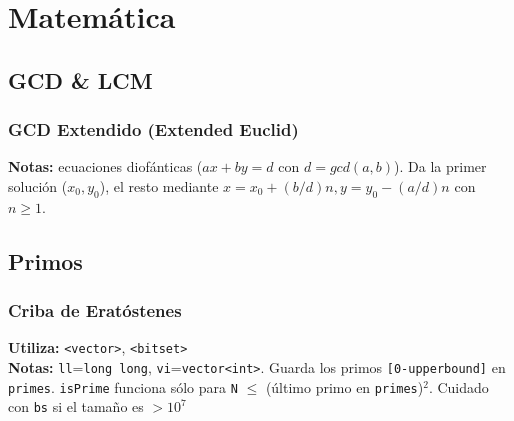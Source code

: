 \section{Matem\'atica}
\subsection{GCD \& LCM}

\subsubsection{GCD Extendido (Extended Euclid)}
\begin{footnotesize}
	\textbf{Notas:} ecuaciones diof\'anticas ($ax+by=d$ con $d=gcd(a,b)$). Da la primer soluci\'on ($x_{0},y_{0}$), el resto mediante $x=x_{0}+(b/d)n, y=y_{0}-(a/d)n$ con $n \geq 1$.
\end{footnotesize}

\subsection{Primos}
\subsubsection{Criba de Erat\'ostenes}
\begin{footnotesize}
	\textbf{Utiliza:} \texttt{<vector>}, \texttt{<bitset>}\\
	\textbf{Notas:} \texttt{ll}=\texttt{long long}, \texttt{vi}=\texttt{vector<int>}. Guarda los primos \texttt{[0-upperbound]} en \texttt{primes}. \texttt{isPrime} funciona s\'olo para \texttt{N} $\leq$ (\'ultimo primo en \texttt{primes})$^{2}$. Cuidado con \texttt{bs} si el tama\~no es $> 10^{7}$
\end{footnotesize}
